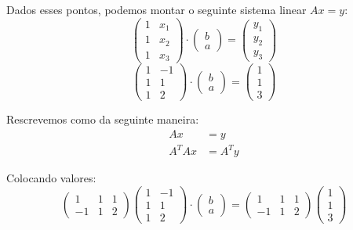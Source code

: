\documentclass[12pt]{article}
\begin{document}
	Dados esses pontos, podemos montar o seguinte sistema linear $Ax=y$:
	\begin{equation*}
		\begin{pmatrix}
			1 & x_{1} \\
			1 & x_{2}\\
			1 & x_{3} 
		\end{pmatrix}\cdot 
		\begin{pmatrix}
			b \\
			a 
		\end{pmatrix}=
		\begin{pmatrix}
			y_1 \\
			y_2 \\
			y_3
		\end{pmatrix}
	\end{equation*}
	\begin{equation*}
		\begin{pmatrix}
			1 & -1 \\
			1 & 1\\
			1 & 2 
		\end{pmatrix}\cdot 
		\begin{pmatrix}
			b \\
			a 
		\end{pmatrix}=
		\begin{pmatrix}
			1 \\
			1 \\
			3
		\end{pmatrix}
	\end{equation*}
	
	Rescrevemos como da seguinte maneira:
	\begin{align*}
		Ax&=y\\
		A^TAx&=A^Ty
	\end{align*}
	
	Colocando valores:
	\begin{equation*}
		\begin{pmatrix}
			1 &1 &1\\
			-1 &1& 2
		\end{pmatrix}
		\begin{pmatrix}
			1 & -1 \\
			1 & 1\\
			1 & 2 
		\end{pmatrix}\cdot 
		\begin{pmatrix}
			b \\
			a 
		\end{pmatrix}=
		\begin{pmatrix}
			1 &1 &1\\
			-1 &1& 2
		\end{pmatrix}
		\begin{pmatrix}
			1 \\
			1 \\
			3
		\end{pmatrix}
	\end{equation*}
	
\end{document}

